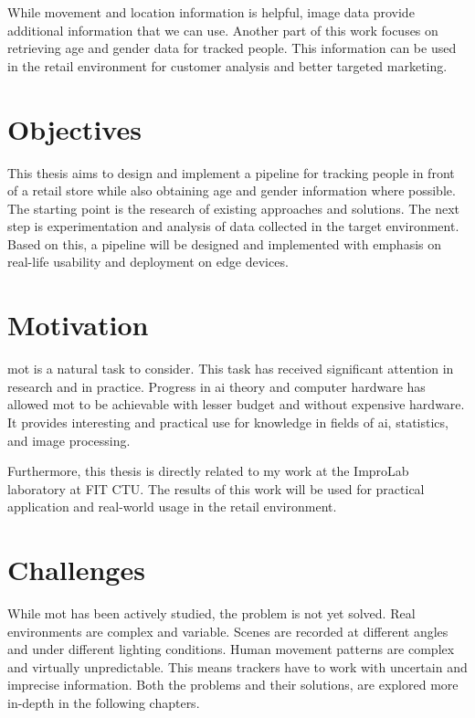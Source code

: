 While movement and location information is helpful, image data provide additional information that we can use. Another part of this work focuses on retrieving age and gender data for tracked people. This information can be used in the retail environment for customer analysis and better targeted marketing.

\section*{Objectives}

This thesis aims to design and implement a pipeline for tracking people in front of a retail store while also obtaining age and gender information where possible. The starting point is the research of existing approaches and solutions. The next step is experimentation and analysis of data collected in the target environment. Based on this, a pipeline will be designed and implemented with emphasis on real-life usability and deployment on edge devices.

\section*{Motivation}

\Gls{mot} is a natural task to consider. This task has received significant attention in research and in practice. Progress in \gls{ai} theory and computer hardware has allowed \gls{mot} to be achievable with lesser budget and without expensive hardware. It provides interesting and practical use for knowledge in fields of \gls{ai}, statistics, and image processing. 

Furthermore, this thesis is directly related to my work at the ImproLab laboratory at FIT CTU. The results of this work will be used for practical application and real-world usage in the retail environment.

\section*{Challenges}

While \gls{mot} has been actively studied, the problem is not yet solved. Real environments are complex and variable. Scenes are recorded at different angles and under different lighting conditions. Human movement patterns are complex and virtually unpredictable. This means trackers have to work with uncertain and imprecise information. Both the problems and their solutions,  are explored more in-depth in the following chapters.

